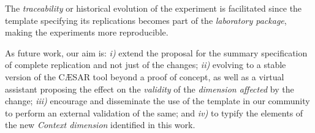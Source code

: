 The \emph{traceability} or historical evolution of the experiment is facilitated since the template specifying its replications becomes part of the \emph{laboratory package}, making the experiments more reproducible.




As future work, our aim is: \emph{i)} extend the proposal for the summary specification of complete replication and not just of the changes;
\emph{ii)} evolving to a stable version of the CÆSAR tool beyond a proof of concept, as well as a virtual assistant proposing the effect on the \emph{validity} of the \emph{dimension affected} by the change;
\emph{iii)} encourage and disseminate the use of the template in our community to perform an external validation of the same; and
\emph{iv)} to typify the elements of the new \emph{Context dimension} identified in this work.


